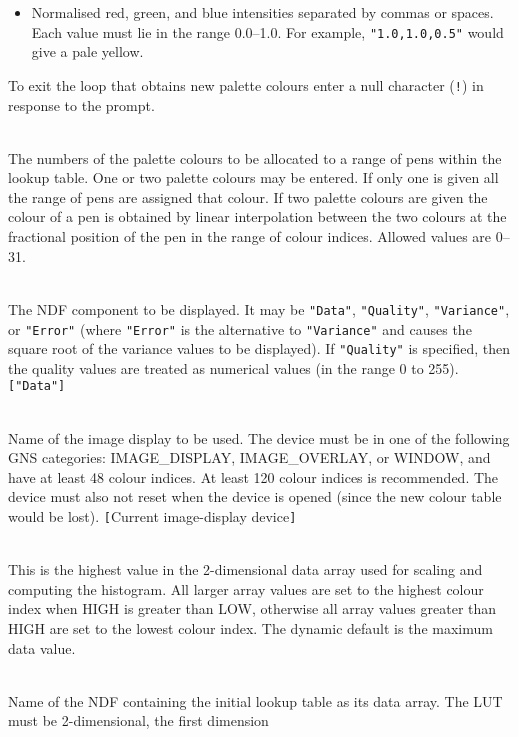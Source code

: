 \documentclass[twoside,11pt]{article}
\newcommand{\sstsubsection}[1]{ \item[{#1}] \mbox{} \\}
\newcommand{\sstsubsection}[1]{\item[{#1}]}
\begin{document}
{{{\begin{itemize}
           \item Normalised red, green, and blue intensities separated by
           commas or spaces.  Each value must lie in the range 0.0--1.0.
           For example, {\tt "1.0,1.0,0.5"} would give a pale yellow.
         \end{itemize}
         To exit the loop that obtains new palette colours enter a null
         character ({\tt !}) in response to the prompt.
      }
      \sstsubsection{
         COLRANGE() = \_INTEGER (Read)
      }{
         The numbers of the palette colours to be allocated to a range
         of pens within the lookup table.  One or two palette colours
         may be entered.  If only one is given all the range of pens
         are assigned that colour.  If two palette colours are given
         the colour of a pen is obtained by linear interpolation
         between the two colours at the fractional position of the pen
         in the range of colour indices.  Allowed values are 0--31.
      }
      \sstsubsection{
         COMP = LITERAL (Read)
      }{
         The NDF component to be displayed.  It may be {\tt "Data"},
         {\tt "Quality"}, {\tt "Variance"}, or {\tt "Error"} (where
         {\tt "Error"} is the alternative to {\tt "Variance"} and causes
         the square root of the variance values to be displayed).
         If {\tt "Quality"} is specified, then the quality values are
         treated as numerical values (in the range 0 to 255).  {\tt ["Data"]}
      }
      \sstsubsection{
         DEVICE = DEVICE (Read)
      }{
         Name of the image display to be used.  The device must be in
         one of the following GNS categories: IMAGE\_DISPLAY,
         IMAGE\_OVERLAY, or WINDOW, and have at least 48 colour indices.
         At least 120 colour indices is recommended.  The device must
         also not reset when the device is opened (since the new colour
         table would be lost).  {\tt [}Current image-display device{\tt ]}
      }
      \sstsubsection{
         HIGH = \_DOUBLE (Read)
      }{
         This is the highest value in the 2-dimensional data array used for
         scaling and computing the histogram.  All larger array values
         are set to the highest colour index when HIGH is greater than
         LOW, otherwise all array values greater than HIGH are set to
         the lowest colour index.  The dynamic default is the maximum
         data value.
      }
      \sstsubsection{
         INLUT = NDF (Read)
      }{
         Name of the NDF containing the initial lookup table as its data
         array.  The LUT must be 2-dimensional, the first dimension
}}}
\end{document}
